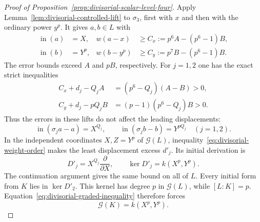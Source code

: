 \begin{proof}[Proof of Proposition~\ref{prop:divisorial-scalar-level-four}]
Apply Lemma~\ref{lem:divisorial-controlled-lift} to $\sigma_3$, first with $x$ and then with the ordinary power $y^p$. It gives $a,b\in L$ with
\begin{align}
 \operatorname{in}(a)&=X,&
 w(a-x)&\ge C_x:=p^6A-(p^6-1)B,\label{eq:divisorial-first-lift-x}\\
 \operatorname{in}(b)&=Y^p,&
 w(b-y^p)&\ge C_y:=p^7B-(p^6-1)B.\label{eq:divisorial-first-lift-y}
\end{align}
The error bounds exceed $A$ and $pB$, respectively. For $j=1,2$ one has the exact strict inequalities
\begin{align*}
 C_x+d_j-Q_jA&=(p^6-Q_j)(A-B)>0,\\
 C_y+d_j-pQ_jB&=(p-1)(p^6-Q_j)B>0.
\end{align*}
Thus the errors in these lifts do not affect the leading displacements:
\begin{equation}\label{eq:divisorial-middle-displacements}
 \operatorname{in}(\sigma_ja-a)=X^{Q_j},\qquad
 \operatorname{in}(\sigma_jb-b)=Y^{pQ_j}
 \quad(j=1,2).
\end{equation}
In the independent coordinates $X,Z=Y^p$ of $\mathcal G(L)$, inequality~\eqref{eq:divisorial-weight-order} makes the least displacement excess $d'_j$. Its initial derivation is
\[
 D'_j=X^{Q_j}\frac{\partial}{\partial X},\qquad
 \ker D'_j=k(X^p,Y^p).
\]
The continuation argument gives the same bound on all of $L$. Every initial form from $K$ lies in $\ker D'_2$. This kernel has degree $p$ in $\mathcal G(L)$, while $[L:K]=p$. Equation~\eqref{eq:divisorial-graded-inequality} therefore forces
\begin{equation}\label{eq:divisorial-middle-fixed}
 \mathcal G(K)=k(X^p,Y^p).
\end{equation}


\end{proof}
